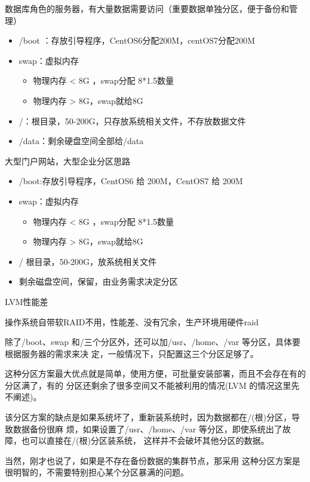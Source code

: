 \begin{ascboxD}{数据库角色的服务器，有大量数据需要访问（重要数据单独分区，便于备份和管理）}
	\begin{itemize}
		\item /boot ：存放引导程序，CentOS6分配200M，centOS7分配200M
		\item swap：虚拟内存
		\begin{itemize}
			\item 物理内存 < 8G ，swap分配 8*1.5数量
			
			\item 物理内存 > 8G，swap就给8G
			
		\end{itemize}
		\item /：根目录，50-200G，只存放系统相关文件，不存放数据文件
		\item /data：剩余硬盘空间全部给/data
	\end{itemize}
\end{ascboxD}

\begin{ascboxD}{大型门户网站，大型企业分区思路}
	\begin{itemize}
		\item /boot:存放引导程序，CentOS6 给 200M，CentOS7 给 200M
		\item swap：虚拟内存
		\begin{itemize}
			\item 物理内存 < 8G ，swap分配 8*1.5数量
			
			\item 物理内存 > 8G，swap就给8G
			
		\end{itemize}
		\item / 根目录，50-200G，放系统相关文件
		\item 剩余磁盘空间，保留，由业务需求决定分区
	\end{itemize}
\end{ascboxD}

LVM性能差

操作系统自带软RAID不用，性能差、没有冗余，生产环境用硬件raid

除了/boot、swap 和/三个分区外，还可以加/usr、/home、/var 等分区，具体要根据服务器的需求来决 定，一般情况下，只配置这三个分区足够了。

这种分区方案最大优点就是简单，使用方便，可批量安装部署，而且不会存在有的分区满了，有的 分区还剩余了很多空间又不能被利用的情况(LVM 的情况这里先不阐述)。

该分区方案的缺点是如果系统坏了，重新装系统时，因为数据都在/(根)分区，导致数据备份很麻 烦，如果设置了/usr、/home、/var 等分区，即使系统出了故障，也可以直接在/(根)分区装系统， 这样并不会破坏其他分区的数据。

当然，刚才也说了，如果是不存在备份数据的集群节点，那采用 这种分区方案是很明智的，不需要特别担心某个分区暴满的问题。




